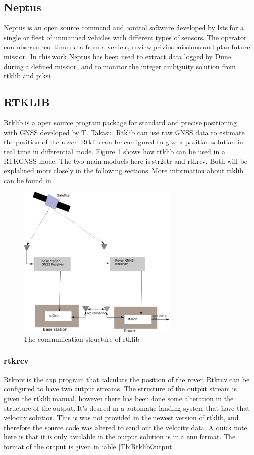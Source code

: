 \subsection{Neptus}
Neptus is an open source command and control software developed by \gls{lsts} for a single or fleet of unmanned vehicles with different types of sensors. The operator can observe real time data from a vehicle, review privios missions and plan future mission. In this work Neptus has been used to extract data logged by Dune during a defined mission, and to monitor the integer ambiguity solution from rtklib and piksi.
\subsection{RTKLIB}\label{ss:Rtklib}
Rtklib is a open source program package for standard and precise positioning with GNSS developed by T. Takasu. Rtklib can use raw GNSS data to estimate the position of the rover. Rtklib can be configured to give a position solution in real time in differential mode. Figure \ref{figure:RTKLIB_STRUCTURE} shows how rtklib can be used in a RTKGNSS mode. The two main moduels here is str2str and rtkrcv. Both will be explalined more closely in the following sections. More information about  rtklib can be found in \citep{Rtklib242}.

\begin{figure}[H]
	\centering
		\includegraphics[width=0.7\textwidth]{figs/Rtklib_structure.png}
		\caption{The communication structure of rtklib}
		\label{figure:RTKLIB_STRUCTURE}
\end{figure}
\subsubsection{rtkrcv}
Rtkrcv is the app program that calculate the position of the rover.
Rtkrcv can be configured to have two output streams. The structure of the output stream is given the rtklib manual, however there has been done some alteration in the structure of the output. It's desired in a automatic landing system that have that velocity solution. This is was not provided in the newest version of rtklib, and therefore the source code was altered to send out the velocity data. A quick note here is that it is only available in the output solution is in a enu format. The format of the output is given in table \ref{Tb:RtklibOutput}.

